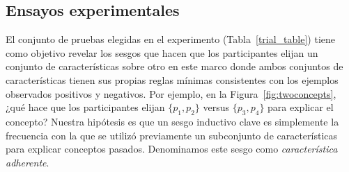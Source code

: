 \subsection{Ensayos experimentales}\label{sec:hypothesis}
     El conjunto de pruebas elegidas en el experimento (Tabla~\ref{trial_table}) tiene como objetivo revelar los sesgos que hacen que los participantes elijan un conjunto de características sobre otro en este marco donde ambos conjuntos de características tienen sus propias reglas mínimas consistentes con los ejemplos observados positivos y negativos. Por ejemplo, en la Figura~\ref{fig:twoconcepts}, ¿qué hace que los participantes elijan $\{p_1, p_2 \}$ versus $\{p_3, p_4 \}$ para explicar el concepto? Nuestra hipótesis es que un sesgo inductivo clave es simplemente la frecuencia con la que se utilizó previamente un subconjunto de características para explicar conceptos pasados. Denominamos este sesgo como \textit{característica adherente}.

\renewcommand{\arraystretch}{1.4}
\newcommand{\marcaEnTabla}{{\bullet}}%



